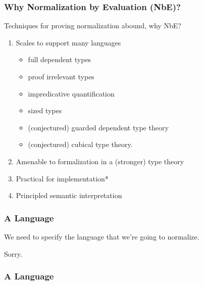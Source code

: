 \documentclass[svgnames]{beamer}
\newcommand\fmttm[1]{{\color{Blue}#1}}
\newcommand{\Uni}{\fmttm{\mathcal{U}}}
\newcommand{\Unit}{\fmttm{\mathsf{Unit}}}
\newcommand{\unit}{\fmttm{\mathsf{tt}}}
\newcommand{\var}[1]{\fmttm{\mathbf{x}_{\color{Black} #1}}}
\newcommand{\emp}{()}
\newcommand{\isctx}[1]{\fmttm{#1}\vdash}
\newcommand{\isterm}[3]{\fmttm{#1}\vdash\fmttm{#2}:\fmttm{#3}}
\newcommand{\istype}[2]{\fmttm{#1}\vdash\fmttm{#2}}
\newcommand{\subst}[3]{{\color{Black} \fmttm{#1}\{\fmttm{#2}/#3\}}}
\newcommand{\weaken}[2]{{\color{Black} \fmttm{#1}\{\uparrow^{#2}\}}}
\newcommand{\app}[2]{{\color{Black} \fmttm{#1}(\fmttm{#2})}}
\begin{document}
\begin{frame}
  \frametitle{Why Normalization by Evaluation (NbE)?}
  Techniques for proving normalization abound, why NbE?
  \begin{enumerate}
  \item Scales to support many languages
    \begin{itemize}
    \item full dependent types
    \item proof irrelevant types
    \item impredicative quantification
    \item sized types
    \item (conjectured) guarded dependent type theory
    \item (conjectured) cubical type theory.
    \end{itemize}
  \item Amenable to formalization in a (stronger) type theory
  \item Practical for implementation*
  \item Principled semantic interpretation
  \end{enumerate}
\end{frame}

\begin{frame}
  \frametitle{A Language}
  We need to specify the language that we're going to normalize.

  \pause
  \bigskip

  Sorry.
\end{frame}
\begin{frame}
  \frametitle{A Language}

\end{frame}
\end{document}
